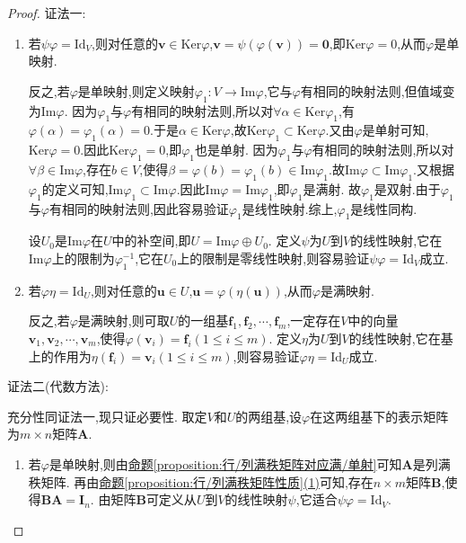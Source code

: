 \documentclass[../../main.tex]{subfiles}
\begin{document}
\begin{proof}
{\color{blue}证法一:}
\begin{enumerate}[(1)]
\item 若\(\psi\varphi = \text{Id}_V\),则对任意的\(\boldsymbol{v}\in\text{Ker}\varphi\),\(\boldsymbol{v}=\psi(\varphi(\boldsymbol{v})) = \boldsymbol{0}\),即\(\text{Ker}\varphi = 0\),从而\(\varphi\)是单映射. 

反之,若\(\varphi\)是单映射,则定义映射\(\varphi_1:V\to\text{Im}\varphi\),它与\(\varphi\)有相同的映射法则,但值域变为\(\text{Im}\varphi\). 
因为\(\varphi_1\)与\(\varphi\)有相同的映射法则,所以对\(\forall \alpha \in \mathrm{Ker}\varphi_1\),有\(\varphi(\alpha)=\varphi_1(\alpha)=0\).于是\(\alpha \in \mathrm{Ker}\varphi\),故\(\mathrm{Ker}\varphi_1\subset \mathrm{Ker}\varphi\).又由\(\varphi\)是单射可知,\(\mathrm{Ker}\varphi = 0\).因此\(\mathrm{Ker}\varphi_1 = 0\),即\(\varphi_1\)也是单射.
因为\(\varphi_1\)与\(\varphi\)有相同的映射法则,所以对\(\forall \beta \in \mathrm{Im}\varphi\),存在\(b \in V\),使得\(\beta = \varphi(b)=\varphi_1(b) \in \mathrm{Im}\varphi_1\).故\(\mathrm{Im}\varphi\subset \mathrm{Im}\varphi_1\).又根据\(\varphi_1\)的定义可知,\(\mathrm{Im}\varphi_1\subset \mathrm{Im}\varphi\).因此\(\mathrm{Im}\varphi = \mathrm{Im}\varphi_1\),即\(\varphi_1\)是满射.
故\(\varphi_1\)是双射.由于\(\varphi_1\)与\(\varphi\)有相同的映射法则,因此容易验证\(\varphi_1\)是线性映射.综上,\(\varphi_1\)是线性同构.

设\(U_0\)是\(\text{Im}\varphi\)在\(U\)中的补空间,即\(U = \text{Im}\varphi\oplus U_0\). 定义\(\psi\)为\(U\)到\(V\)的线性映射,它在\(\text{Im}\varphi\)上的限制为\(\varphi_1^{-1}\),它在\(U_0\)上的限制是零线性映射,则容易验证\(\psi\varphi = \text{Id}_V\)成立.

\item 若\(\varphi\eta = \text{Id}_U\),则对任意的\(\boldsymbol{u}\in U\),\(\boldsymbol{u}=\varphi(\eta(\boldsymbol{u}))\),从而\(\varphi\)是满映射. 

反之,若\(\varphi\)是满映射,则可取\(U\)的一组基\(\boldsymbol{f}_1,\boldsymbol{f}_2,\cdots,\boldsymbol{f}_m\),一定存在\(V\)中的向量\(\boldsymbol{v}_1,\boldsymbol{v}_2,\cdots,\boldsymbol{v}_m\),使得\(\varphi(\boldsymbol{v}_i)=\boldsymbol{f}_i(1\leqslant  i\leqslant  m)\). 定义\(\eta\)为\(U\)到\(V\)的线性映射,它在基上的作用为\(\eta(\boldsymbol{f}_i)=\boldsymbol{v}_i(1\leqslant  i\leqslant  m)\),则容易验证\(\varphi\eta = \text{Id}_U\)成立.
\end{enumerate}
{\color{blue}证法二(代数方法):}

充分性同{\color{blue}证法一},现只证必要性. 取定\(V\)和\(U\)的两组基,设\(\varphi\)在这两组基下的表示矩阵为\(m\times n\)矩阵\(\boldsymbol{A}\).
\begin{enumerate}[(1)]
\item 若\(\varphi\)是单映射,则由\hyperref[proposition:行/列满秩矩阵对应满/单射]{命题\ref{proposition:行/列满秩矩阵对应满/单射}}可知\(\boldsymbol{A}\)是列满秩矩阵. 再由\hyperref[proposition:行/列满秩矩阵性质]{命题\ref{proposition:行/列满秩矩阵性质}(1)}可知,存在\(n\times m\)矩阵\(\boldsymbol{B}\),使得\(\boldsymbol{B}\boldsymbol{A}=\boldsymbol{I}_n\). 由矩阵\(\boldsymbol{B}\)可定义从\(U\)到\(V\)的线性映射\(\psi\),它适合\(\psi\varphi=\text{Id}_V\).


\end{enumerate}
\end{proof}
\end{document}
